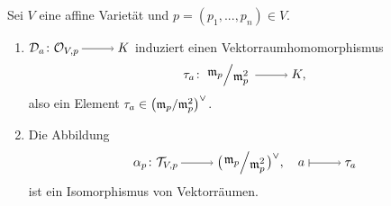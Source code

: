 \documentclass[a4paper,12pt,index=toc]{scrbook}
\theoremstyle{keinenummern} %
\def\O{\mathcal{O}}
\newcommand{\DD}{\mathcal{D}} %
\def\T{\mathcal{T}}
\def\m{\mathfrak{m}}
\renewcommand{\dotsc}{\ensuremath{\!...}}
\begin{document}
\begin{defprop}\label{3.3.9}
Sei $V$ eine affine Varietät und $p=(p_{1},\dotsc,p_{n})\in V$.
\begin{enumerate}
\item{} $\DD_{a}\colon\O_{V,p}\ra K$ induziert einen Vektorraumhomomorphismus
\begin{equation*}\tau_{a}\colon\Quotient{\m_{p}}{\m_{p}^{2}}\ra K,\end{equation*}
also ein Element $\tau_{a}\in\bigl(\Quotient{\m_{p}}{\m_{p}^{2}}\bigr)^{\vee}$.
\item{} Die Abbildung
\begin{equation*}\alpha_{p}\colon \T_{V,p}\ra\bigl(\Quotient{\m_{p}}{\m_{p}^{2}}\bigr)^{\vee},\quad a\mapsto\tau_{a}\end{equation*}
ist ein Isomorphismus von Vektorräumen.
\end{enumerate}\end{defprop}
\end{document}
